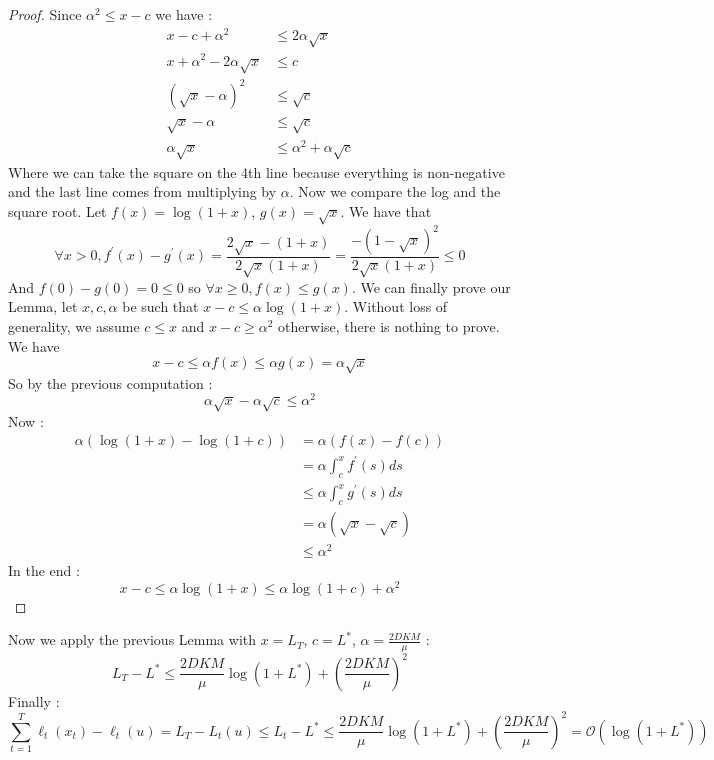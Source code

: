 \begin{solution}[]
\begin{proof}
Since $ \alpha^2 \leq x-c $ we have :
\begin{align*}
	x-c + \alpha^2 &\leq 2\alpha\sqrt{x}\\
	x+\alpha^2 - 2\alpha \sqrt{x} &\leq c \\
	(\sqrt{x} - \alpha)^2 &\leq \sqrt{c} \\
	\sqrt{x}- \alpha &\leq \sqrt{c} \\
	\alpha \sqrt{x} &\leq \alpha^2 + \alpha \sqrt{c}
\end{align*}
Where we can take the square on the 4th line because everything is non-negative and the last line comes from multiplying by $ \alpha $.
Now we compare the log and the square root. Let $ f(x) = \log(1+x) $, $ g(x)= \sqrt{x} $. We have that
\begin{equation*}
	\forall x > 0, f^{\prime}(x) - g^{\prime}(x) = \frac{2\sqrt{x}-(1+x)}{2\sqrt{x}(1+x)} = \frac{-(1-\sqrt{x})^2}{2\sqrt{x}(1+x)} \leq 0
\end{equation*}
And $ f(0) -g(0) = 0 \leq 0 $ so $\forall x \geq 0, f(x) \leq g(x) $.
We can finally prove our Lemma, let $ x,c, \alpha $ be such that $ x-c \leq \alpha\log(1+x) $. Without loss of generality, we assume $ c\leq x $ and $ x-c \geq \alpha^2 $ otherwise, there is nothing to prove.
We have
\begin{equation*}
	x-c \leq \alpha f(x) \leq \alpha g(x) = \alpha \sqrt{x}
\end{equation*}
So by the previous computation :
\begin{equation*}
	\alpha\sqrt{x} - \alpha\sqrt{c} \leq \alpha^2 
\end{equation*}
Now :
\begin{align*}
	\alpha(\log(1+x) - \log(1+c)) &= \alpha(f(x) - f(c))\\
				      &= \alpha \int_{c}^{x} f^{\prime}(s)ds \\
				      &\leq \alpha \int_{c}^{x} g^{\prime}(s)ds \\
				      &= \alpha(\sqrt{x}- \sqrt{c}) \\
				      &\leq \alpha^2
\end{align*}
In the end :
\begin{equation*}
	x-c \leq \alpha\log(1+x) \leq \alpha\log(1+c) + \alpha^2
\end{equation*}
\end{proof}
Now we apply the previous Lemma with $ x= L_T $, $ c=L^{*} $, $ \alpha = \frac{2DKM}{\mu} $ :
\begin{equation*}
	L_T - L^{*} \leq \frac{2DKM}{\mu} \log(1+L^{*}) + \left( \frac{2DKM}{\mu} \right)^2
\end{equation*}
Finally :
\begin{equation*}
	\sum_{t=1}^{T}\ell_t(x_t)-\ell_t(u) = L_T - L_t(u) \leq L_t -L^{*} \leq  \frac{2DKM}{\mu}\log(1+L^{*}) + \left( \frac{2DKM}{\mu} \right)^2 = \mathcal{O}(\log(1+L^{*}))
\end{equation*}










\end{solution}
